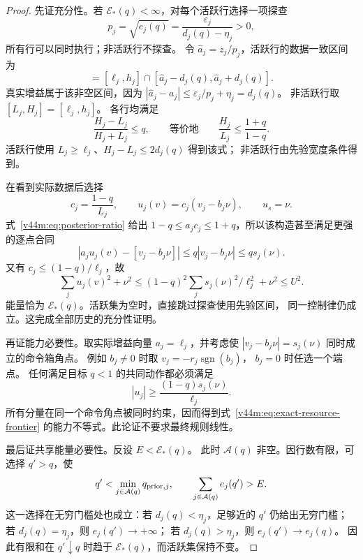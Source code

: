 \documentclass[11pt,a4paper]{article}
\numberwithin{equation}{section}
\theoremstyle{definition}
\begin{document}
\begin{proof}
先证充分性。若 $\mathcal E_*(q)<\infty$，对每个活跃行选择一项探查
\begin{equation}
 p_j=\sqrt{e_j(q)}
 =\frac{\varepsilon_j}{d_j(q)-\eta_j}>0,
 \label{v44m:eq:attaining-probe}
\end{equation}
所有行可以同时执行；非活跃行不探查。
令 $\widehat a_j=z_j/p_j$，活跃行的数据一致区间为
\begin{equation}
 [L_j,H_j]
 =[\ell_j,h_j]\cap
 [\widehat a_j-d_j(q),\widehat a_j+d_j(q)].
 \label{v44m:eq:posterior-interval}
\end{equation}
真实增益属于该非空区间，因为
$|\widehat a_j-a_j|\le\varepsilon_j/p_j+\eta_j=d_j(q)$。
非活跃行取 $[L_j,H_j]=[\ell_j,h_j]$。
各行均满足
\begin{equation}
 \frac{H_j-L_j}{H_j+L_j}\le q,
 \qquad\text{等价地}\qquad
 \frac{H_j}{L_j}\le\frac{1+q}{1-q}.
 \label{v44m:eq:posterior-ratio}
\end{equation}
活跃行使用 $L_j\ge\ell_j$、$H_j-L_j\le2d_j(q)$ 得到该式；
非活跃行由先验宽度条件得到。

在看到实际数据后选择
\begin{equation}
 \boxed{
 c_j=\frac{1-q}{L_j},\qquad
 u_j(v)=c_j(v_j-b_j\nu),\qquad u_s=\nu.}
 \label{v44m:eq:attaining-controller}
\end{equation}
式~\eqref{v44m:eq:posterior-ratio} 给出
$1-q\le a_jc_j\le1+q$，所以该构造甚至满足更强的逐点合同
\begin{equation}
 |a_ju_j(v)-[v_j-b_j\nu]|
 \le q|v_j-b_j\nu|
 \le q s_j(\nu).
\end{equation}
又有 $c_j\le(1-q)/\ell_j$，故
\begin{equation}
 \sum_j u_j(v)^2+\nu^2
 \le(1-q)^2\sum_j s_j(\nu)^2/\ell_j^2+\nu^2\le U^2.
\end{equation}
能量恰为 $\mathcal E_*(q)$。活跃集为空时，直接跳过探查使用先验区间，
同一控制律仍成立。这完成全部历史的充分性证明。

再证能力必要性。取实际增益向量 $a_j=\ell_j$，并考虑使
$|v_j-b_j\nu|=s_j(\nu)$ 同时成立的命令箱角点。
例如 $b_j\ne0$ 时取 $v_j=-r_j\operatorname{sgn}(b_j)$，
$b_j=0$ 时任选一个端点。
任何满足目标 $q<1$ 的共同动作都必须满足
\begin{equation}
 |u_j|\ge\frac{(1-q)s_j(\nu)}{\ell_j}.
\end{equation}
所有分量在同一个命令角点被同时约束，因而得到式~\eqref{v44m:eq:exact-resource-frontier}
的能力不等式。此论证不要求最终规则线性。

最后证共享能量必要性。反设 $E<\mathcal E_*(q)$。
此时 $\mathcal A(q)$ 非空。因行数有限，可选择 $q'>q$，使
\begin{equation}
 q'<\min_{j\in\mathcal A(q)}q_{{\rm prior},j},
 \qquad \sum_{j\in\mathcal A(q)}e_j(q')>E.
 \label{v44m:eq:strict-target-choice}
\end{equation}
这一选择在无穷门槛处也成立：若 $d_j(q)<\eta_j$，足够近的 $q'$ 仍给出无穷门槛；
若 $d_j(q)=\eta_j$，则 $e_j(q')\to+\infty$；
若 $d_j(q)>\eta_j$，则 $e_j(q')\to e_j(q)$。
因此有限和在 $q'\downarrow q$ 时趋于 $\mathcal E_*(q)$，而活跃集保持不变。


\end{proof}
\end{document}
